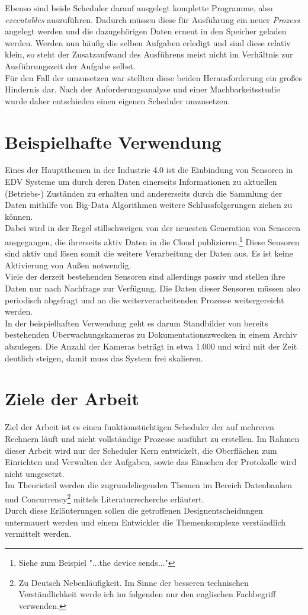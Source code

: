 Ebenso sind beide Scheduler darauf ausgelegt komplette Programme, also \emph{executables} auszuführen. Dadurch müssen diese für Ausführung ein neuer \emph{Prozess} angelegt werden und die dazugehörigen Daten erneut in den Speicher geladen werden. Werden nun häufig die selben Aufgaben erledigt und sind diese relativ klein, so steht der Zusatzaufwand des Ausführens meist nicht im Verhältnis zur Ausführungszeit der Aufgabe selbst.\\
Für den Fall der umzusetzen war stellten diese beiden Herausforderung ein großes Hindernis dar. Nach der Anforderungsanalyse und einer Machbarkeitsstudie wurde daher entschieden einen eigenen Scheduler umzusetzen.

\section{Beispielhafte Verwendung}
Eines der Hauptthemen in der Industrie 4.0 ist die Einbindung von Sensoren in EDV Systeme um durch deren Daten einerseits Informationen zu aktuellen (Betriebs-) Zuständen zu erhalten und andererseits durch die Sammlung der Daten mithilfe von Big-Data Algorithmen weitere Schlussfolgerungen ziehen zu können.\cite[S. 36ff]{Manzei2015}\\
Dabei wird in der Regel stillschweigen von der neuesten Generation von Sensoren ausgegangen, die ihrerseits aktiv Daten in die Cloud publizieren.\footnote{Siehe zum Beispiel \cite{ms_azureiot} "...the device sends..."} Diese Sensoren sind aktiv und lösen somit die weitere Verarbeitung der Daten aus. Es ist keine Aktivierung von Außen notwendig.\\
Viele der derzeit bestehenden Sensoren sind allerdings passiv und stellen ihre Daten nur nach Nachfrage zur Verfügung. Die Daten dieser Sensoren müssen also periodisch abgefragt und an die weiterverarbeitenden Prozesse weitergereicht werden.\\
In der beispielhaften Verwendung geht es darum Standbilder von bereits bestehenden Überwachungskameras zu Dokumentationszwecken in einem Archiv abzulegen. Die Anzahl der Kameras beträgt in etwa 1.000 und wird mit der Zeit deutlich steigen, damit muss das System frei skalieren.\\ 
\section{Ziele der Arbeit}
Ziel der Arbeit ist es einen funktionstüchtigen Scheduler der auf mehreren Rechnern läuft und nicht vollständige Prozesse ausführt zu erstellen. Im Rahmen dieser Arbeit wird nur der Scheduler Kern entwickelt, die Oberflächen zum Einrichten und Verwalten der Aufgaben, sowie das Einsehen der Protokolle wird nicht umgesetzt.
\\Im Theorieteil werden die zugrundeliegenden Themen im Bereich Datenbanken und Concurrency\footnote{Zu Deutsch Nebenläufigkeit. Im Sinne der besseren technischen Verständlichkeit werde ich im folgenden nur den englischen Fachbegriff verwenden.} mittels Literaturrecherche erläutert.\\ Durch diese Erläuterungen sollen die getroffenen Designentscheidungen untermauert werden und einem Entwickler die Themenkomplexe verständlich vermittelt werden.

